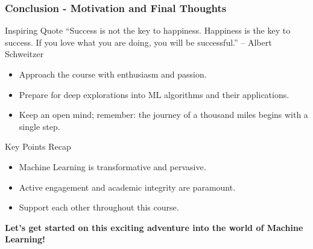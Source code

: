 \documentclass[aspectratio=169]{beamer}
\begin{document}
\begin{frame}[fragile]
    \frametitle{Conclusion - Motivation and Final Thoughts}
    \begin{block}{Inspiring Quote}
        “Success is not the key to happiness. Happiness is the key to success. If you love what you are doing, you will be successful.” – Albert Schweitzer
    \end{block}

    \begin{itemize}
        \item Approach the course with enthusiasm and passion.
        \item Prepare for deep explorations into ML algorithms and their applications.
        \item Keep an open mind; remember: the journey of a thousand miles begins with a single step.
    \end{itemize}
    
    \begin{block}{Key Points Recap}
        \begin{itemize}
            \item Machine Learning is transformative and pervasive.
            \item Active engagement and academic integrity are paramount.
            \item Support each other throughout this course.
        \end{itemize}
    \end{block}

    \centering \textbf{Let’s get started on this exciting adventure into the world of Machine Learning!}
\end{frame}
\end{document}
